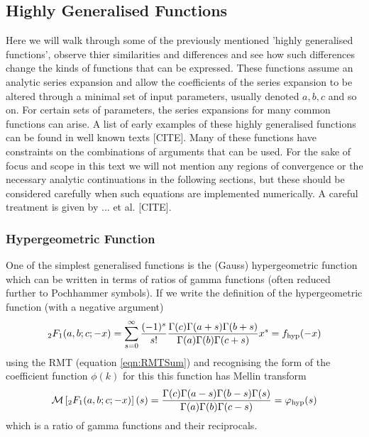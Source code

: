 \documentclass[journal=jcisd8,manuscript=article,layout=onecolumn,pdftex,floatfix,amsmath,amssymb,10pt]{achemso}
\begin{document}
\subsection{Highly Generalised Functions}
Here we will walk through some of the previously mentioned 'highly generalised functions', observe thier similarities and differences and see how such differences change the kinds of functions that can be expressed. These functions assume an analytic series expansion and allow the coefficients of the series expansion to be altered through a minimal set of input parameters, usually denoted $a,b,c$ and so on. For certain sets of parameters, the series expansions for many common functions can arise. A list of early examples of these highly generalised functions can be found in well known texts [CITE]. Many of these functions have constraints on the combinations of arguments that can be used. For the sake of focus and scope in this text we will not mention any regions of convergence or the necessary analytic continuations in the following sections, but these should be considered carefully when such equations are implemented numerically. A careful treatment is given by ... et al. [CITE].

\subsubsection{Hypergeometric Function}
One of the simplest generalised functions is the (Gauss) hypergeometric function which can be written in terms of ratios of gamma functions (often reduced further to Pochhammer symbols). If we write the definition of the hypergeometric function (with a negative argument)
\begin{equation}
_2F_1(a,b;c;-x) = \sum_{s=0}^\infty \frac{(-1)^s}{s!} \frac{\Gamma(c)\Gamma(a+s)\Gamma(b+s)}{\Gamma(a)\Gamma(b)\Gamma(c+s)} x^s = f_{\rm hyp}(-x)
\label{eqn:hypergeom}
\end{equation}
using the RMT (equation \ref{eqn:RMTSum}) and recognising the form of the coefficient function $\phi(k)$ for this this function has Mellin transform
\begin{equation}
\mathcal{M}\left[_2F_1(a,b;c;-x)\right](s) = \frac{\Gamma(c)\Gamma(a-s)\Gamma(b-s)\Gamma(s)}{\Gamma(a)\Gamma(b)\Gamma(c-s)} = \varphi_{\rm hyp}(s)
\end{equation}
which is a ratio of gamma functions and their reciprocals.
\end{document}
